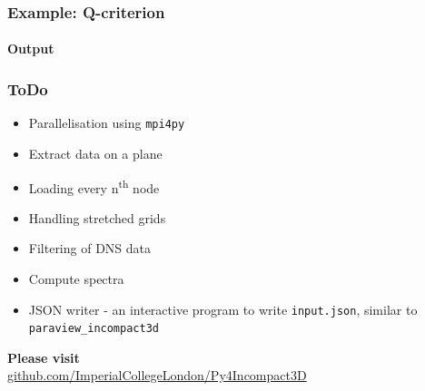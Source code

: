 \documentclass{beamer}
\begin{document}
\begin{frame}
  \frametitle{Example: Q-criterion}
  \framesubtitle{Output}
  
\end{frame}

\begin{frame}
  \frametitle{ToDo}

  \centering

  \begin{itemize}
  \item Parallelisation using \texttt{mpi4py}
  \item Extract data on a plane
  \item Loading every n\textsuperscript{th} node
  \item Handling stretched grids
  \item Filtering of DNS data
  \item Compute spectra
  \item JSON writer - an interactive program to write \texttt{input.json}, similar to
    \texttt{paraview\_incompact3d}
  \end{itemize}
  
  \textbf{Please visit}\\
  \url{github.com/ImperialCollegeLondon/Py4Incompact3D}
\end{frame}
\end{document}
